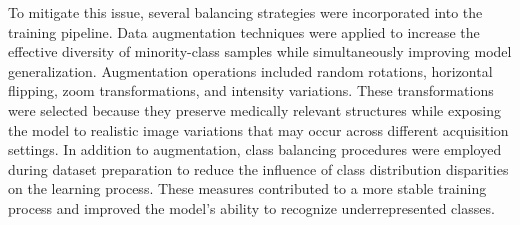 To mitigate this issue, several balancing strategies were incorporated into the training pipeline. Data augmentation techniques were applied to increase the effective diversity of minority-class samples while simultaneously improving model generalization. Augmentation operations included random rotations, horizontal flipping, zoom transformations, and intensity variations. These transformations were selected because they preserve medically relevant structures while exposing the model to realistic image variations that may occur across different acquisition settings. In addition to augmentation, class balancing procedures were employed during dataset preparation to reduce the influence of class distribution disparities on the learning process. These measures contributed to a more stable training process and improved the model's ability to recognize underrepresented classes.

